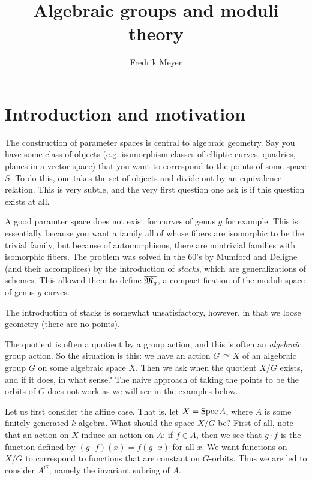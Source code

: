 \documentclass[11pt, english]{article}
\begin{document}
\title{Algebraic groups and moduli theory}
\author{Fredrik Meyer}
\maketitle 


\section{Introduction and motivation}

The construction of parameter spaces is central to algebraic geometry. Say you have some class of objects (e.g. isomorphism classes of elliptic curves, quadrics, planes in a vector space) that you want to correspond to the points of some space $S$. To do this, one takes the set of objects and divide out by an equivalence relation. This is very subtle, and the very first question one ask is if this question exists at all.

A good paramter space does not exist for curves of genus $g$ for example. This is essentially because you want a family all of whose fibers are isomorphic to be the trivial family, but because of automorphisms, there are nontrivial families with isomorphic fibers. The problem was solved in the 60's by Mumford and Deligne (and their accomplices) by the introduction of \emph{stacks}, which are generalizations of schemes. This allowed them to define $\overline{\mathfrak M_g}$, a compactification of the moduli space of genus $g$ curves.

The introduction of stacks is somewhat unsatisfactory, however, in that we loose geometry (there are no points).

The quotient is often a quotient by a group action, and this is often an \emph{algebraic} group action. So the situation is this: we have an action $G \curvearrowright X$ of an algebraic group $G$ on some algebraic space $X$. Then we ask when the quotient $X/G$ exists, and if it does, in what sense? The naive approach of taking the points to be the orbits of $G$ does not work as we will see in the examples below.

Let us first consider the affine case. That is, let $X = \operatorname{Spec} A$, where $A$ is some finitely-generated $k$-algebra. What should the space $X/G$ be? First of all, note that an action on $X$ induce an action on $A$: if $f \in A$, then we see that $g \cdot f$ is the function defined by $(g \cdot f)(x)=f(g \cdot x)$ for all $x$. We want functions on $X/G$ to correspond to functions that are constant on $G$-orbits. Thus we are led to consider $A^G$, namely the invariant subring of $A$.
\end{document}
